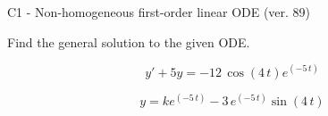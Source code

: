 \begin{exercise}
  \begin{exerciseTitle}C1 - Non-homogeneous first-order linear ODE (ver. 89)\end{exerciseTitle}
  \begin{exerciseStatement}
    
Find the general solution to the given ODE.

    
\[y'+5y= -12 \, \cos\left(4 \, t\right) e^{\left(-5 \, t\right)}\]

  \end{exerciseStatement}
  \begin{exerciseAnswer}
    
\[y= k e^{\left(-5 \, t\right)} - 3 \, e^{\left(-5 \, t\right)} \sin\left(4 \, t\right)\]

  \end{exerciseAnswer}
\end{exercise}